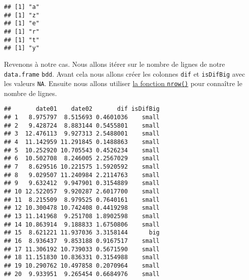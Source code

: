 \documentclass[]{book}
\newenvironment{Shaded}{\begin{snugshade}}{\end{snugshade}}
\newcommand{\KeywordTok}[1]{\textcolor[rgb]{0.13,0.29,0.53}{\textbf{#1}}}
\newcommand{\DataTypeTok}[1]{\textcolor[rgb]{0.13,0.29,0.53}{#1}}
\newcommand{\DecValTok}[1]{\textcolor[rgb]{0.00,0.00,0.81}{#1}}
\newcommand{\StringTok}[1]{\textcolor[rgb]{0.31,0.60,0.02}{#1}}
\newcommand{\OtherTok}[1]{\textcolor[rgb]{0.56,0.35,0.01}{#1}}
\newcommand{\ControlFlowTok}[1]{\textcolor[rgb]{0.13,0.29,0.53}{\textbf{#1}}}
\newcommand{\OperatorTok}[1]{\textcolor[rgb]{0.81,0.36,0.00}{\textbf{#1}}}
\newcommand{\NormalTok}[1]{#1}
\theoremstyle{definition}
\theoremstyle{definition}
\theoremstyle{definition}
\theoremstyle{remark}
\begin{document}
\begin{verbatim}
## [1] "a"
## [1] "z"
## [1] "e"
## [1] "r"
## [1] "t"
## [1] "y"
\end{verbatim}

Revenons à notre cas. Nous allons itérer sur le nombre de lignes de
notre \texttt{data.frame} \texttt{bdd}. Avant cela nous allons créer les
colonnes \texttt{dif} et \texttt{isDifBig} avec les valeurs \texttt{NA}.
Ensuite nous allons utiliser \protect\hyperlink{l015nrow}{la fonction
\texttt{nrow()}} pour connaître le nombre de lignes.

\begin{Shaded}
\end{Shaded}

\begin{verbatim}
##       date01    date02       dif isDifBig
## 1   8.975797  8.515693 0.4601036    small
## 2   9.428724  8.883144 0.5455801    small
## 3  12.476113  9.927313 2.5488001    small
## 4  11.142959 11.291845 0.1488863    small
## 5  10.252920 10.705543 0.4526234    small
## 6  10.502708  8.246005 2.2567029    small
## 7   8.629516 10.221575 1.5920592    small
## 8   9.029507 11.240984 2.2114763    small
## 9   9.632412  9.947901 0.3154889    small
## 10 12.522057  9.920287 2.6017700    small
## 11  8.215509  8.979525 0.7640161    small
## 12 10.300478 10.742408 0.4419298    small
## 13 11.141968  9.251708 1.8902598    small
## 14 10.863914  9.188833 1.6750806    small
## 15  8.621221 11.937036 3.3158144      big
## 16  8.936437  9.853188 0.9167517    small
## 17 11.306192 10.739033 0.5671590    small
## 18 11.151830 10.836331 0.3154988    small
## 19 10.290762 10.497858 0.2070964    small
## 20  9.933951  9.265454 0.6684976    small
\end{verbatim}
\end{document}
